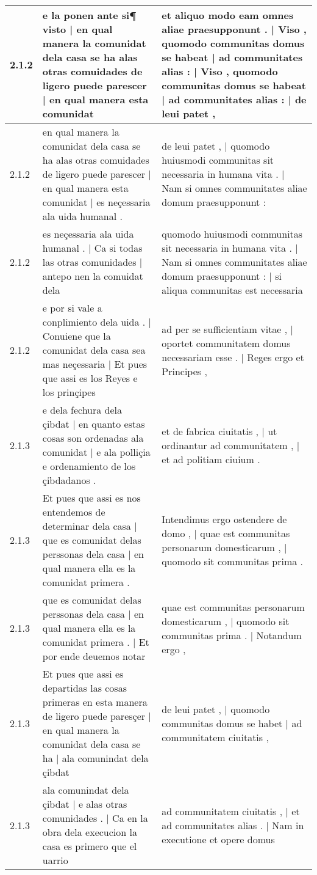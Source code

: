 \begin{tabular}{|p{1cm}|p{6.5cm}|p{6.5cm}|}
2.1.2 & e la ponen ante si¶ visto | en qual manera la comunidat dela casa se ha alas otras comuidades de ligero puede parescer | en qual manera esta comunidat & et aliquo modo eam omnes aliae praesupponunt . | Viso , quomodo communitas domus se habeat | ad communitates alias : | Viso , quomodo communitas domus se habeat | ad communitates alias : | de leui patet , \\\hline
2.1.2 & en qual manera la comunidat dela casa se ha alas otras comuidades de ligero puede parescer | en qual manera esta comunidat | es neçessaria ala uida humanal . & de leui patet , | quomodo huiusmodi communitas sit necessaria in humana vita . | Nam si omnes communitates aliae domum praesupponunt : \\\hline
2.1.2 & es neçessaria ala uida humanal . | Ca si todas las otras comunidades | antepo nen la comuidat dela & quomodo huiusmodi communitas sit necessaria in humana vita . | Nam si omnes communitates aliae domum praesupponunt : | si aliqua communitas est necessaria \\\hline
2.1.2 & e por si vale a conplimiento dela uida . | Conuiene que la comunidat dela casa sea mas neçessaria | Et pues que assi es los Reyes e los prinçipes & ad per se sufficientiam vitae , | oportet communitatem domus necessariam esse . | Reges ergo et Principes , \\\hline
2.1.3 & e dela fechura dela çibdat | en quanto estas cosas son ordenadas ala comunidat | e ala polliçia e ordenamiento de los çibdadanos . & et de fabrica ciuitatis , | ut ordinantur ad communitatem , | et ad politiam ciuium . \\\hline
2.1.3 & Et pues que assi es nos entendemos de determinar dela casa | que es comunidat delas perssonas dela casa | en qual manera ella es la comunidat primera . & Intendimus ergo ostendere de domo , | quae est communitas personarum domesticarum , | quomodo sit communitas prima . \\\hline
2.1.3 & que es comunidat delas perssonas dela casa | en qual manera ella es la comunidat primera . | Et por ende deuemos notar & quae est communitas personarum domesticarum , | quomodo sit communitas prima . | Notandum ergo , \\\hline
2.1.3 & Et pues que assi es departidas las cosas primeras en esta manera de ligero puede paresçer | en qual manera la comunidat dela casa se ha | ala comunindat dela çibdat & de leui patet , | quomodo communitas domus se habet | ad communitatem ciuitatis , \\\hline
2.1.3 & ala comunindat dela çibdat | e alas otras comunidades . | Ca en la obra dela execucion la casa es primero que el uarrio & ad communitatem ciuitatis , | et ad communitates alias . | Nam in executione et opere domus \\\hline

\end{tabular}

